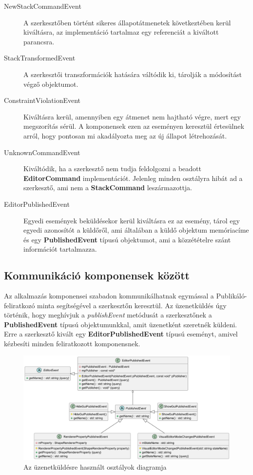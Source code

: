 \begin{description}
	\item[NewStackCommandEvent] A szerkesztőben történt sikeres állapotátmenetek következtében kerül kiváltásra, az implementáció tartalmaz egy referenciát a kiváltott parancsra.
	\item[StackTransformedEvent] A szerkesztői transzformációk hatására váltódik ki, tárolják a módosítást végző objektumot.
	\item[ConstraintViolationEvent] Kiváltásra kerül, amennyiben egy átmenet nem hajtható végre, mert egy megszorítás sérül. A komponensek ezen az eseményen keresztül értesülnek arról, hogy pontosan mi akadályozta meg az új állapot létrehozását.
	\item[UnknownCommandEvent] Kiváltódik, ha a szerkesztő nem tudja feldolgozni a beadott \textbf{EditorCommand} implementációt. Jelenleg minden osztályra hibát ad a szerkesztő, ami nem a \textbf{StackCommand} leszármazottja.
	\item[EditorPublishedEvent] Egyedi események beküldésekor kerül kiváltásra ez az esemény, tárol egy egyedi azonosítót a küldőről, ami általában a küldő objektum memóriacíme és egy \textbf{PublishedEvent} típusú objektumot, ami a közzétételre szánt információt tartalmazza.
\end{description}

\subsection{Kommunikáció komponensek között}

Az alkalmazás komponensei szabadon kommunikálhatnak egymással a Publikáló-feliratkozó minta segítségével a szerkesztőn keresztül. Az üzenetküldés úgy történik, hogy meghívjuk a \textit{publishEvent} metódusát a szerkesztőnek a \textbf{PublishedEvent} típusú objektumunkkal, amit üzenetként szeretnék küldeni. Erre a szerkesztő kivált egy \textbf{EditorPublishedEvent} típusú eseményt, amivel kézbesíti minden feliratkozott komponensnek.

\begin{figure}[H]
	\centering
	\includegraphics[width=1\linewidth]{images/class_editor_published_event.png}
	\caption{Az üzenetküldésre használt osztályok diagramja}
	\label{fig:class_editor_published_event-1}
\end{figure}

